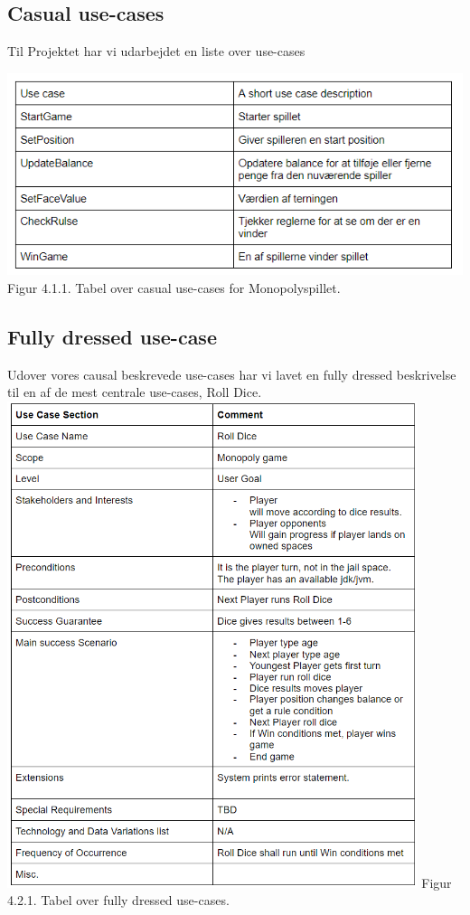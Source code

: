 \begin{flushleft}
\subsection{Casual use-cases}
\doublespacing


Til Projektet har vi udarbejdet en liste over use-cases

\includegraphics[width=1\textwidth]{Report/figures/Use case.PNG}
Figur 4.1.1. Tabel over casual use-cases for Monopolyspillet.
\newpage
\subsection{Fully dressed use-case}
Udover vores causal beskrevede use-cases har vi lavet en fully dressed beskrivelse til en af de mest centrale use-cases, Roll Dice.
\addlinespace
\includegraphics[width=0.9\textwidth]{Report/figures/Fullyusecase.png}
Figur 4.2.1. Tabel over fully dressed use-cases.


\end{flushleft}
